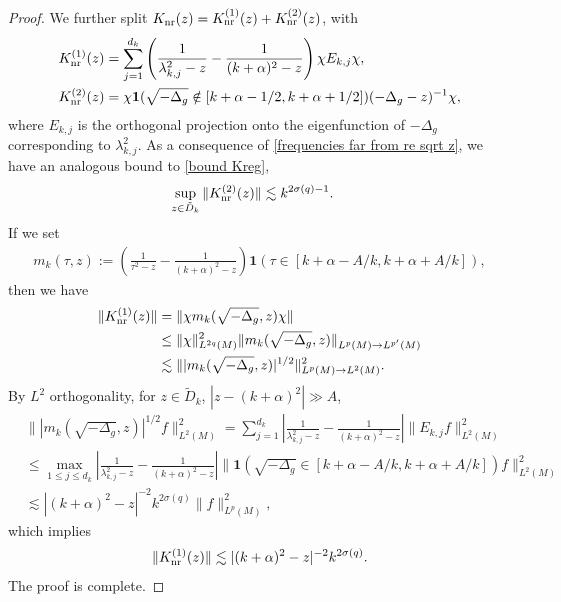 \documentclass[12pt]{amsart}
\begin{document}
\begin{proof}
 We further split $K_{\rm nr}(z)=K^{(1)}_{\rm nr}(z)+K^{(2)}_{\rm nr}(z)$, with
 \begin{align}
K^{(1)}_{\rm nr}(z)&=\sum_{j=1}^{d_k}\left(\frac{1}{\lambda_{k,j}^2-z}-\frac{1}{(k+\alpha)^2-z}\right)\chi E_{k,j}\chi,\\
 K^{(2)}_{\rm nr}(z)&=\chi\mathbf{1}(\sqrt{-\Delta_g}\notin[k+\alpha-1/2,k+\alpha+1/2])(-\Delta_g-z)^{-1}\chi,   
\end{align}
where $E_{k,j}$ is the orthogonal projection onto the eigenfunction of $-\Delta_g$ corresponding to $\lambda_{k,j}^2$.
As a consequence of \eqref{frequencies far from re sqrt z}, we have an analogous bound to \eqref{bound Kreg},
\begin{align}\label{bound K^2_nr}
    \sup_{z\in \tilde{D}_k}\|K^{(2)}_{\rm nr}(z)\|&\lesssim k^{2\sigma(q)-1}.
\end{align}
If we set
\begin{align}
   m_k(\tau,z):=\left(\frac{1}{\tau^2-z}-\frac{1}{(k+\alpha)^2-z}\right)\mathbf{1}(\tau\in [k+\alpha-A/k,k+\alpha+  A/k]),
   \end{align}
then we have
\begin{align}
 \|K^{(1)}_{\rm nr}(z)\|&=\|\chi m_k(\sqrt{-\Delta
_g},z)\chi\|\\
&\leq \|\chi\|^2_{L^{2q}(M)}\|m_k(\sqrt{-\Delta
_g},z)\|_{L^p(M)\to L^{p'}(M)}\\
&\lesssim \||m_k(\sqrt{-\Delta
_g},z)|^{1/2}\|_{L^p(M)\to L^{2}(M)}^2.
\end{align}
By $L^2$ orthogonality, for $z\in \tilde{D}_k$, $|z-(k+\alpha)^2|\gg A$,
\begin{align}
&\||m_k(\sqrt{-\Delta_g},z)|^{1/2}f\|_{L^{2}(M)}^2 
=\sum_{j=1}^{d_k}\left|\frac{1}{\lambda_{k,j}^2-z}-\frac{1}{(k+\alpha)^2-z}\right| \|E_{k,j}f\|_{L^{2}(M)}^2\\
&\leq \max_{1\leq j\leq d_k}\left|\frac{1}{\lambda_{k,j}^2-z}-\frac{1}{(k+\alpha)^2-z}\right| \|\mathbf{1}(\sqrt{-\Delta_g}\in[k+\alpha-A/k,k+\alpha+  A/k])f\|_{L^{2}(M)}^2\\
&\lesssim |(k+\alpha)^2-z|^{-2}k^{2\sigma(q)}\|f\|_{L^{p}(M)}^2,
\end{align}
which implies
\begin{align}\label{bound K^1_nr}
   \|K^{(1)}_{\rm nr}(z)\|\lesssim |(k+\alpha)^2-z|^{-2}k^{2\sigma(q)}.
\end{align}   
The proof is complete.
\end{proof}
\end{document}

